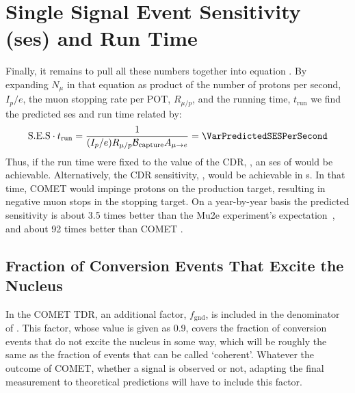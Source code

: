 \section{Single Signal Event Sensitivity (\acs{ses}) and Run Time}
\TabSensParams
\TabSensEstimates
Finally, it remains to pull all these numbers together into equation .
By expanding $N_\mu$ in that equation as product of the number of protons per second, $I_p/e$, the muon stopping rate per \ac{POT}, $R_{\mu/p}$, and the running time, $t_\textrm{run}$ we find the predicted \ac{ses} and run time related by:
\begin{align}
	\eqlabel{sense:runtime}
	\mathrm{S.E.S}\cdot{}t_\textrm{run}=\frac{1}{(I_p/e){R}_{\mu/p}\mathcal{B}_\mathrm{capture} A_{\mu\rightarrow e}}=\VarPredictedSESPerSecond
\end{align}
Thus, if the run time were fixed to the value of the CDR, \VarCDRRunTime[2], an \ac{ses} of \VarPredictedSESCDRRunTime would be achievable.
Alternatively, the CDR sensitivity, \VarPredictedSES, would be achievable in \VarRunTime[2]s.  
In that time, COMET \phaseII would impinge \VarTotalPOT protons on the production target, resulting in \VarTotalMuStops negative muon stops in the stopping target.
On a year-by-year basis the predicted \phaseII sensitivity is about 3.5 times better than the Mu2e experiment's expectation~\cite{Mu2e2014}, and about 92 times better than COMET \phaseI.

\subsection{Fraction of Conversion Events That Excite the Nucleus}
In the COMET \phaseI TDR, an additional factor, $f_\textrm{gnd}$, is included in the denominator of .
This factor, whose value is given as 0.9, covers the fraction of conversion events that do not excite the nucleus in some way, which will be roughly the same as the fraction of events that can be called `coherent'.
Whatever the outcome of COMET, whether a signal is observed or not, adapting the final measurement to theoretical predictions will have to include this factor.

